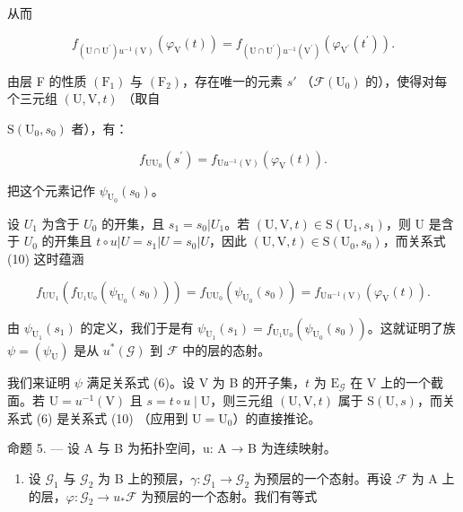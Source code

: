 从而

\[
f_{(\mathrm{U}\cap\mathrm{U}^{\prime})u^{-1}(\mathrm{V})}(\varphi_{\mathrm{V}}(t)) = f_{(\mathrm{U}\cap\mathrm{U}^{\prime})u^{-1}(\mathrm{V}^{\prime})}(\varphi_{\mathrm{V}^{\prime}}(t^{\prime})).\tag{9}
\]

由层 F 的性质 \((\mathrm{F}_{1})\) 与 \((\mathrm{F}_{2})\)，存在唯一的元素 \(s'\) （\(\mathcal{F}(\mathrm{U}_{0})\) 的），使得对每个三元组 \((\mathrm{U},\mathrm{V},t)\) （取自

\(\mathrm{S}(\mathrm{U}_{0},s_{0})\) 者），有：

\[
f_{\mathrm{U}\mathrm{U}_{0}}(s^{\prime}) = f_{\mathrm{U}u^{-1}(\mathrm{V})}(\varphi_{\mathrm{V}}(t)).\tag{10}
\]

把这个元素记作 \(\psi_{\mathrm{U}_{0}}(s_{0})\)。

设 \(U_{1}\) 为含于 \(U_{0}\) 的开集，且 \(s_{1}=s_{0}|U_{1}\)。若 \((\mathrm{U},\mathrm{V},t)\in\mathrm{S}(\mathrm{U}_{1},s_{1})\)，则 U 是含于 \(U_{0}\) 的开集且 \(t\circ u|U=s_{1}|U=s_{0}|U\)，因此 \((\mathrm{U},\mathrm{V},t)\in\mathrm{S}(\mathrm{U}_{0},s_{0})\)，而关系式 (10) 这时蕴涵

\[
f_{\mathrm{U}\mathrm{U}_{1}}(f_{\mathrm{U}_{1}\mathrm{U}_{0}}(\psi_{\mathrm{U}_{0}}(s_{0}))) = f_{\mathrm{U}\mathrm{U}_{0}}(\psi_{\mathrm{U}_{0}}(s_{0})) = f_{\mathrm{U}u^{-1}(\mathrm{V})}(\varphi_{\mathrm{V}}(t)).
\]

由 \(\psi_{\mathrm{U}_{1}}(s_{1})\) 的定义，我们于是有 \(\psi_{\mathrm{U}_{1}}(s_{1}) = f_{\mathrm{U}_{1}\mathrm{U}_{0}}(\psi_{\mathrm{U}_{0}}(s_{0}))\)。这就证明了族 \(\psi = (\psi_{\mathrm{U}})\) 是从 \(u^{*}(\mathcal{G})\) 到 \(\mathcal{F}\) 中的层的态射。

我们来证明 \(\psi\) 满足关系式 (6)。设 V 为 B 的开子集，\(t\) 为 \(\mathrm{E}_{\mathcal{G}}\) 在 V 上的一个截面。若 \(\mathrm{U} = u^{-1}(\mathrm{V})\) 且 \(s = t \circ u \mid \mathrm{U}\)，则三元组 \((\mathrm{U}, \mathrm{V}, t)\) 属于 \(\mathrm{S}(\mathrm{U}, s)\)，而关系式 (6) 是关系式 (10) （应用到 \(\mathrm{U} = \mathrm{U}_0\)）的直接推论。

命题 5. — 设 A 与 B 为拓扑空间，u: A → B 为连续映射。

\begin{enumerate}
\def\labelenumi{\alph{enumi})}
\tightlist
\item
  设 \(\mathcal{G}_1\) 与 \(\mathcal{G}_2\) 为 B 上的预层，\(\gamma\colon\mathcal{G}_1\to\mathcal{G}_2\) 为预层的一个态射。再设 \(\mathcal{F}\) 为 A 上的层，\(\varphi\colon\mathcal{G}_2\to u_*\mathcal{F}\) 为预层的一个态射。我们有等式
\end{enumerate}

